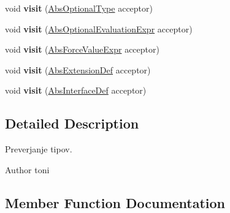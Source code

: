 \begin{DoxyCompactItemize}
void {\bfseries visit} (\hyperlink{classcompiler_1_1abstr_1_1tree_1_1type_1_1_abs_optional_type}{Abs\+Optional\+Type} acceptor)
\item 
\mbox{\label{classcompiler_1_1seman_1_1_type_checker_a66c3844d96bb801141eb98bb4e2c26fb}} 
void {\bfseries visit} (\hyperlink{classcompiler_1_1abstr_1_1tree_1_1expr_1_1_abs_optional_evaluation_expr}{Abs\+Optional\+Evaluation\+Expr} acceptor)
\item 
\mbox{\label{classcompiler_1_1seman_1_1_type_checker_aa1035e2fc4604827111f9378dd1aa09f}} 
void {\bfseries visit} (\hyperlink{classcompiler_1_1abstr_1_1tree_1_1expr_1_1_abs_force_value_expr}{Abs\+Force\+Value\+Expr} acceptor)
\item 
\mbox{\label{classcompiler_1_1seman_1_1_type_checker_ae4a43de48b1c71297b46632425302bd0}} 
void {\bfseries visit} (\hyperlink{classcompiler_1_1abstr_1_1tree_1_1def_1_1_abs_extension_def}{Abs\+Extension\+Def} acceptor)
\item 
\mbox{\label{classcompiler_1_1seman_1_1_type_checker_a3e24f3f5fdae615485c3fb7b3fa219cd}} 
void {\bfseries visit} (\hyperlink{classcompiler_1_1abstr_1_1tree_1_1def_1_1_abs_interface_def}{Abs\+Interface\+Def} acceptor)
\end{DoxyCompactItemize}


\subsection{Detailed Description}
Preverjanje tipov.

\begin{DoxyAuthor}{Author}
toni 
\end{DoxyAuthor}


\subsection{Member Function Documentation}
\mbox{\label{classcompiler_1_1seman_1_1_type_checker_af864f483112627f92788301f59ec7664}} 
